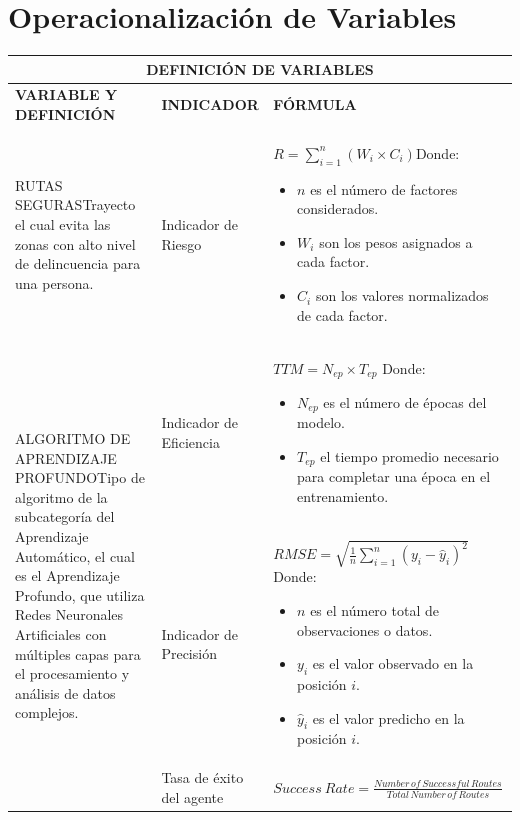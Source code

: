 \section{Operacionalización de Variables}
\medskip
\begin{table}[h!]
	\centering
	\small
	\begin{tabularx}{\textwidth}{|X|X|X|}
		\hline
		\multicolumn{3}{|c|}{\textbf{DEFINICIÓN DE VARIABLES}} \\
		\hline
		\textbf{VARIABLE Y DEFINICIÓN} & \textbf{INDICADOR} & \textbf{FÓRMULA} \\
		\hline
		RUTAS SEGURAS\newline Trayecto el cual evita las zonas con alto nivel de delincuencia para una persona. & Indicador de Riesgo & $R = \sum _{i=1}^{n}(W_{i}\times C_{i})$\newline Donde: 
		\begin{itemize}
			\item $n$ es el número de factores considerados.
			\item $W_{i}$ son los pesos asignados a cada factor.
			\item $C_{i}$ son los valores normalizados de cada factor.
		\end{itemize} \\
		\hline
		\multirow{3}{\hsize}{ALGORITMO DE APRENDIZAJE PROFUNDO\newline Tipo de algoritmo de la subcategoría del Aprendizaje Automático, el cual es el Aprendizaje Profundo, que utiliza Redes Neuronales Artificiales con múltiples capas para el procesamiento y análisis de datos complejos.} & Indicador de Eficiencia & $TTM = N_{ep} \times T_{ep}$ \newline Donde: 
		\begin{itemize}
			\item $N_{ep}$ es el número de épocas del modelo.
			\item $T_{ep}$ el tiempo promedio necesario para completar una época en el entrenamiento.
		\end{itemize}\\
		\cline{2-3}
		& Indicador de Precisión & $RMSE = \sqrt{\frac{1}{n}\sum _{i = 1}^{n}(y_{i}-\hat{y}_{i})^{2}}$ \newline Donde: 
		\begin{itemize}
			\item $n$ es el número total de observaciones o datos.
			\item $y_{i}$ es el valor observado en la posición $i$.
			\item $\hat{y}_{i}$ es el valor predicho en la posición $i$.
		\end{itemize}\\
		\cline{2-3}
		& Tasa de éxito del agente & $Success\: Rate = \frac{Number\,of \, Successful\,Routes}{Total\,Number\,of \, Routes}$ \\
		\hline
	\end{tabularx}
\end{table}
\medskip
